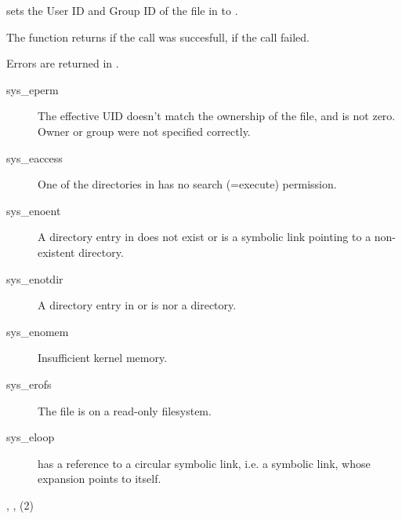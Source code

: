 {  sets the User ID and Group ID of the file in  to .

The function returns  if the call was succesfull,  if the call
failed.
}
{
Errors are returned in .
\begin{description}
\item[sys\_eperm] The effective UID doesn't match the ownership of the file,
and is not zero. Owner or group were not specified correctly.
\item[sys\_eaccess] One of the directories in  has no
search (=execute) permission.
\item[sys\_enoent] A directory entry in  does
not exist or is a symbolic link pointing to a non-existent directory.
\item[sys\_enotdir] A directory entry in  or  is
nor a directory.
\item[sys\_enomem] Insufficient kernel memory.
\item[sys\_erofs] The file is on a read-only filesystem.
\item[sys\_eloop]  has a reference to a circular
symbolic link, i.e. a symbolic link, whose expansion points to itself.
\end{description}
}
{, , (2)}



